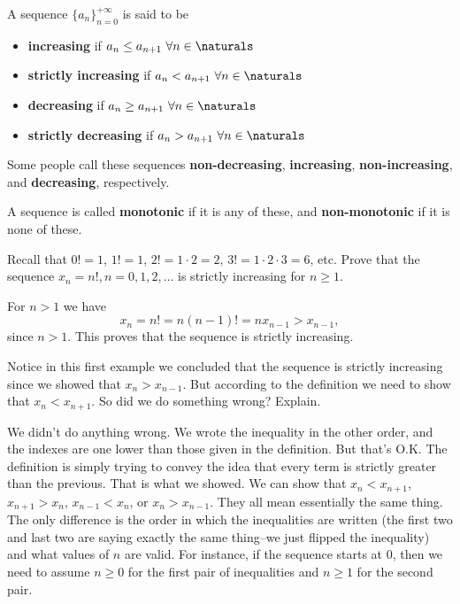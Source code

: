 \begin{df}
A sequence $\{a_n\} _{n=0} ^{+\infty}$ is said to 
be 
\begin{itemize}
\item
{}
{\bf increasing} if $a_{n}\leq a_{n + 1} \ \forall
n\in\naturals$
\item  
{}
{\bf strictly increasing} if $a_n < a_{n + 1}
\ \forall n\in\naturals$
\item
{}
{\bf decreasing} if $a_{n}\geq a_{n + 1} \ \forall
n\in\naturals$
\item
{}
{\bf strictly decreasing} if $a_n > a_{n + 1}
\ \forall n\in\naturals$
\end{itemize}
Some people call these sequences 
{\bf non-decreasing}, {\bf increasing}, {\bf non-increasing}, and {\bf decreasing}, respectively. 

A sequence is called {\bf monotonic} if it is any of these, 
and {\bf non-monotonic} if it is none of these.
\end{df}

\begin{exa}
Recall that $0! = 1$, $1! = 1$, $2! = 1\cdot 2 = 2$, $3! = 1\cdot 2
\cdot 3 = 6$, etc. Prove that the sequence $x_n = n!, n = 0, 1, 2,
\ldots$ is strictly increasing for $n \geq 1$.
 \begin{pf}   For $n > 1$ we have $$x_n = n! = n(n - 1)! = nx_{n - 1}
> x_{n - 1},
$$since $n>1$. This proves that the sequence is strictly
increasing.
\end{pf}
\end{exa}

\begin{ques}
Notice in this first example we concluded that the sequence is strictly increasing since we showed that
$x_n>x_{n-1}$.  But according to the definition we need to show that $x_n<x_{n+1}$.  
So did we do something wrong?  Explain.

\noindent
\answerlinethree
\begin{answer}
We didn't do anything wrong.  We wrote the inequality in the other order, and the indexes are one lower
than those given in the definition.  But that's O.K.  The definition is simply trying to convey the idea
that every term is strictly greater than the previous.  That is what we showed.  
We can show that  
$x_n<x_{n+1}$, $x_{n+1}>x_n$, $x_{n-1}<x_{n}$, or $x_n>x_{n-1}$.  They all mean essentially the same thing. 
The only difference is the order in which the inequalities are written (the first two and last two are
saying exactly the same thing--we just flipped the inequality) and what values of $n$ are valid.
For instance, if the sequence starts at $0$, then we need to assume
$n\geq 0$ for the first pair of inequalities and  $n\geq 1$ for the second pair. 
\end{answer}
\end{ques} 


